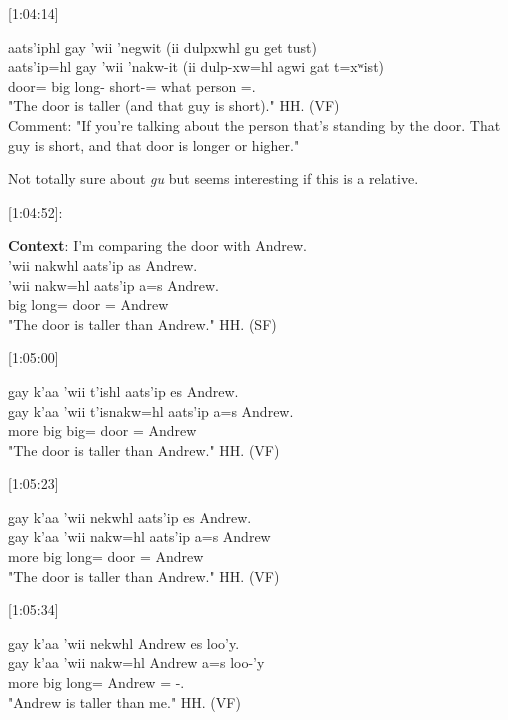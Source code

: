 [1:04:14]
\begin{exe}
    \ex \glll
    aats'iphl g̱ay 'wii 'negwit (ii dulpxwhl gu get tust) \\ 
    aats'ip=hl g̱ay 'wii 'nakw-it (ii dulp-xw=hl agwi gat t=xʷist) \\ 
    door=\Cn{} \Cntr{} big long-\Sx{} \Ccnj{} short-\Tr=\Cn{} what person \Pn=\Dem.\Dist{} \\
    \glt "The door is taller (and that guy is short)." \hfill HH.\ElicitationDate{} (VF) \\
    Comment: "If you're talking about the person that's standing by the door. That guy is short, and that door is longer or higher."
\end{exe}

Not totally sure about \textit{gu} but seems interesting if this is a relative. 

[1:04:52]:
\begin{exe}
    \ex \textbf{Context}: I'm comparing the door with Andrew. \\
    \glll
    'wii nakwhl aats'ip as Andrew. \\
    'wii nakw=hl aats'ip a=s Andrew. \\
    big long=\Cn{} door \Prep=\Pn{} Andrew \\
    \glt "The door is taller than Andrew." \hfill HH.\ElicitationDate{} (SF)
\end{exe}

[1:05:00]
\begin{exe}
    \ex \glll
    g̱ay k'aa 'wii t'ishl aats'ip es Andrew. \\
    g̱ay k'aa 'wii t'isnakw=hl aats'ip a=s Andrew. \\
    \Cntr{} more big big=\Cn{} door \Prep=\Pn{} Andrew \\
    \glt "The door is taller than Andrew." \hfill HH.\ElicitationDate{} (VF)
\end{exe}

[1:05:23]
\begin{exe}
    \ex \glll
    g̱ay k'aa 'wii nekwhl aats'ip es Andrew. \\
    g̱ay k'aa 'wii nakw=hl aats'ip a=s Andrew \\
    \Cntr{} more big long=\Cn{} door \Prep=\Pn{} Andrew \\
    \glt "The door is taller than Andrew." \hfill HH.\ElicitationDate{} (VF)
\end{exe}

[1:05:34]
\begin{exe}
    \ex \glll
    g̱ay k'aa 'wii nekwhl Andrew es loo'y. \\
    g̱ay k'aa 'wii nakw=hl Andrew a=s loo-'y \\
    \Cntr{} more big long=\Cn{} Andrew \Prep=\Pn{} \Obl-\Fsg.\Ii \\
    \glt "Andrew is taller than me." \hfill HH.\ElicitationDate{} (VF)
\end{exe}


